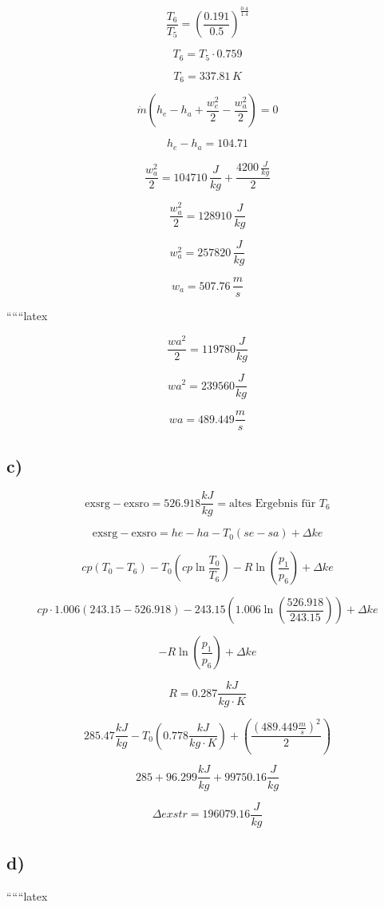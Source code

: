 \[
\frac{T_6}{T_5} = \left( \frac{0.191}{0.5} \right)^{\frac{0.4}{1.4}}
\]

\[
T_6 = T_5 \cdot 0.759
\]

\[
T_6 = 337.81 \, K
\]

\[
\dot{m} (h_e - h_a + \frac{w_e^2}{2} - \frac{w_a^2}{2}) = 0
\]

\[
h_e - h_a = 104.71
\]

\[
\frac{w_a^2}{2} = 104710 \, \frac{J}{kg} + \frac{4200 \, \frac{J}{kg}}{2}
\]

\[
\frac{w_a^2}{2} = 128910 \, \frac{J}{kg}
\]

\[
w_a^2 = 257820 \, \frac{J}{kg}
\]

\[
w_a = 507.76 \, \frac{m}{s}
\]

``````latex


\[
\frac{w a^2}{2} = 119780 \frac{J}{kg}
\]

\[
w a^2 = 239560 \frac{J}{kg}
\]

\[
w a = 489.449 \frac{m}{s}
\]

\subsection*{c)}

\[
\text{exsrg} - \text{exsro} = 526.918 \frac{kJ}{kg} = \text{altes Ergebnis für } T_6
\]

\[
\text{exsrg} - \text{exsro} = he - ha - T_0 (se - sa) + \Delta ke
\]

\[
cp (T_0 - T_6) - T_0 (cp \ln \frac{T_0}{T_6}) - R \ln (\frac{p_1}{p_6}) + \Delta ke
\]

\[
cp \cdot 1.006 \left( 243.15 - 526.918 \right) - 243.15 \left( 1.006 \ln \left( \frac{526.918}{243.15} \right) \right) + \Delta ke
\]

\[
- R \ln \left( \frac{p_1}{p_6} \right) + \Delta ke
\]

\[
R = 0.287 \frac{kJ}{kg \cdot K}
\]

\[
285.47 \frac{kJ}{kg} - T_0 \left( 0.778 \frac{kJ}{kg \cdot K} \right) + \left( \frac{(489.449 \frac{m}{s})^2}{2} \right)
\]

\[
285 + 96.299 \frac{kJ}{kg} + 99750.16 \frac{J}{kg}
\]

\[
\Delta exstr = 196079.16 \frac{J}{kg}
\]

\subsection*{d)}

``````latex


